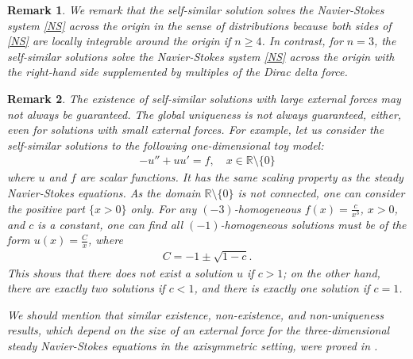\documentclass[12pt]{amsart}
\newtheorem{remark}{Remark}[section]
\newcommand{\Bu}{{\boldsymbol{u}}}
\begin{document}
	\begin{remark}
		We remark that the self-similar solution 
		solves the Navier-Stokes system \eqref{NS} across the origin in the sense of distributions because both sides of \eqref{NS} are locally integrable around the origin if $n\geq 4$. In contrast, for $n=3$, the self-similar solutions solve the Navier-Stokes system \eqref{NS} across the origin with the right-hand side supplemented by multiples of the Dirac delta force.
	\end{remark}
	
	\begin{remark}
		The existence of self-similar solutions with large external forces may not always be  guaranteed. The global uniqueness is not always guaranteed, either, even for solutions with small external forces. For example, let us consider the self-similar solutions to the following one-dimensional toy model:
		\begin{align}
			\label{Burger}
			-u''+uu'=f , \quad x\in \mathbb{R}\setminus \{0\}
		\end{align}
		where $u$ and $f$ are scalar functions.  It has the same scaling property as the steady Navier-Stokes equations. As the domain $\mathbb{R}\setminus \{0\}$ is not connected, one can consider the positive part $\{x>0\}$ only.
		For any $(-3)$-homogeneous $f(x)=\frac{c}{x^3}$, $x>0$,   and $c$ is a constant, one can find all  $(-1)$-homogeneous solutions must be of the form $u(x)=\frac{C}{x}$, where
		\begin{align*}
			C=-1\pm \sqrt{1-c}.
		\end{align*}
		This shows that there does not exist a solution $u$ if $c>1$; on the other hand, there are exactly two solutions if $c<1$, and there is exactly one solution if $c=1$. 
		
		We should mention that similar existence, non-existence, and non-uniqueness results, which depend on the size of an external force for the three-dimensional steady Navier-Stokes equations in the axisymmetric setting, were proved in \cite{Shi18}.
		
			
	\end{remark}
	
\end{document}
